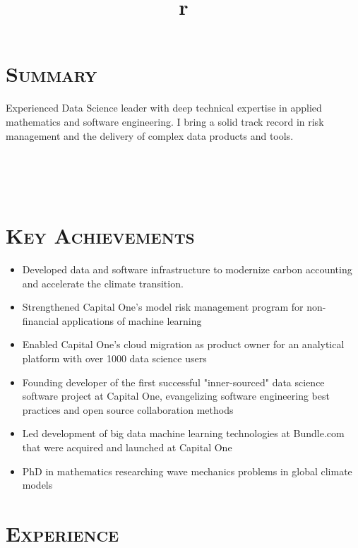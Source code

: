 \begin{resume}

\section{\textsc{Summary}}

Experienced Data Science leader with deep technical expertise in applied mathematics and software engineering. I bring a solid track record in risk management and the delivery of complex data products and tools. 

\begin{formatb}
  \title{r}\\
  \\
  \body\\
\end{formatb}

\section{\textsc{Key Achievements}}
\begin{itemize}
  \item Developed data and software infrastructure to modernize carbon accounting and accelerate the climate transition.
  \item Strengthened Capital One's model risk management program for non-financial applications of machine learning
  \item Enabled Capital One's cloud migration as product owner for an analytical platform with over 1000 data science users
  \item Founding developer of the first successful "inner-sourced" data science software project at Capital One, evangelizing software engineering best practices and open source collaboration methods
  \item Led development of big data machine learning technologies at Bundle.com that were acquired and launched at Capital One
  \item PhD in mathematics researching wave mechanics problems in global climate models
  
\end{itemize}
\section{\textsc{Experience}}


\end{resume}
